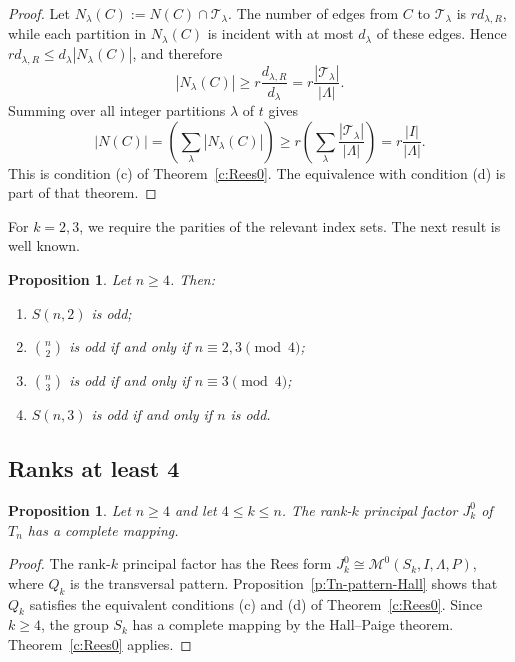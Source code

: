 \documentclass[11pt]{article}
\theoremstyle{plain}
\newtheorem{prop}[theorem]{Proposition}
\theoremstyle{remark}
\theoremstyle{definition}
\theoremstyle{plain}
\begin{document}
\begin{proof}
Let $N_\lambda(C):=N(C)\cap\mathcal T_\lambda$. 
The number of edges from $C$ to $\mathcal T_\lambda$ is $r d_{\lambda,R}$, while
each partition in $N_\lambda(C)$ is incident with at most $d_\lambda$ of these
edges. Hence $r d_{\lambda,R}\le d_\lambda |N_\lambda(C)|$,
and therefore
\[
        |N_\lambda(C)|\ge r\frac{d_{\lambda,R}}{d_\lambda}
        =r\frac{|\mathcal T_\lambda|}{|\Lambda|}.
\]
Summing over all integer partitions $\lambda$ of $t$ gives
\[
        |N(C)|=\left(\sum_\lambda |N_\lambda(C)|\right)
        \ge r\left(\sum_\lambda\frac{|\mathcal T_\lambda|}{|\Lambda|}\right)
        =r\frac{|I|}{|\Lambda|}.
\]
This is condition (c) of Theorem~\ref{c:Rees0}. The equivalence with condition
(d) is part of that theorem.
\end{proof}

For $k=2,3$, we require the parities of the relevant index sets. The next result is well known.

\begin{prop}\label{p:Tn-small-rank-parity}
Let $n\ge4$. Then:
\begin{enumerate}
\item $S(n,2)$ is odd;
\item $\binom n2$ is odd if and only if $n\equiv2,3\pmod4$;
\item $\binom n3$ is odd if and only if $n\equiv3\pmod4$;
\item $S(n,3)$ is odd if and only if $n$ is odd.
\end{enumerate}
\end{prop}

\subsection{Ranks at least 4}
\label{Sec:Tn-ranks-at-least-four}

\begin{prop}\label{p:Tn-ranks-at-least-four}
Let $n\ge4$ and let $4\le k\le n$. The rank-$k$ principal factor $J_k^0$ of
$T_n$ has a complete mapping.
\end{prop}

\begin{proof}
The rank-$k$ principal factor has the Rees form
$J_k^0\cong\mathcal M^0(S_k,I,\Lambda,P)$,
where $Q_k$ is the transversal pattern. Proposition~\ref{p:Tn-pattern-Hall}
shows that $Q_k$ satisfies the equivalent conditions (c) and (d) of
Theorem~\ref{c:Rees0}. Since $k\ge4$, the group $S_k$ has a complete mapping
by the Hall--Paige theorem. Theorem~\ref{c:Rees0} applies.
\end{proof}
\end{document}

